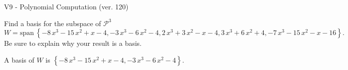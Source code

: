 \begin{exercise}
  \begin{exerciseTitle}V9 - Polynomial Computation (ver. 120)\end{exerciseTitle}
  \begin{exerciseStatement}
    Find a basis for the subspace of \(\mathcal{P}^3\) 
\[W=\mathrm{span}\ \left\{-8 \, x^{3} - 15 \, x^{2} + x - 4 , -3 \, x^{3} - 6 \, x^{2} - 4 , 2 \, x^{3} + 3 \, x^{2} - x - 4 , 3 \, x^{3} + 6 \, x^{2} + 4 , -7 \, x^{3} - 15 \, x^{2} - x - 16\right\}.\]
 Be sure to explain why your result is a basis.


  \end{exerciseStatement}
  \begin{exerciseAnswer}
   A basis of \(W\) is  \(\left\{-8 \, x^{3} - 15 \, x^{2} + x - 4 , -3 \, x^{3} - 6 \, x^{2} - 4\right\}\).
  


  \end{exerciseAnswer}
\end{exercise}